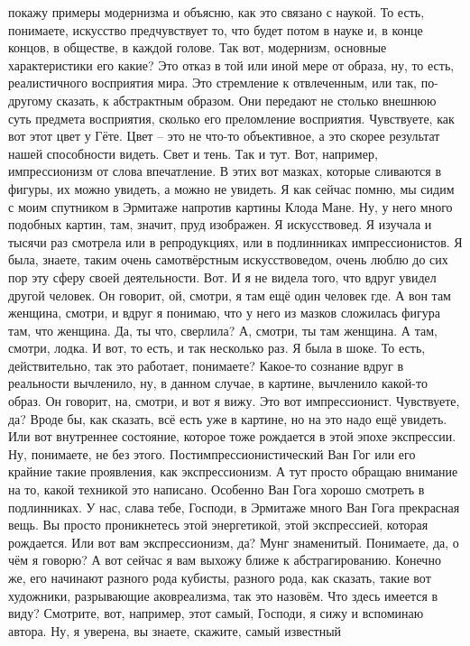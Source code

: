 покажу примеры модернизма и объясню, как это связано с наукой. То есть,
понимаете, искусство предчувствует то, что будет потом в науке и, в конце
концов, в обществе, в каждой голове. Так вот, модернизм, основные характеристики
его какие? Это отказ в той или иной мере от образа, ну, то есть, реалистичного
восприятия мира. Это стремление к отвлеченным, или так, по-другому сказать, к
абстрактным образом. Они передают не столько внешнюю суть предмета восприятия,
сколько его преломление восприятия. Чувствуете, как вот этот цвет у Гёте. Цвет –
это не что-то объективное, а это скорее результат нашей способности видеть. Свет
и тень. Так и тут. Вот, например, импрессионизм от слова впечатление. В этих вот
мазках, которые сливаются в фигуры, их можно увидеть, а можно не увидеть. Я как
сейчас помню, мы сидим с моим спутником в Эрмитаже напротив картины Клода Мане.
Ну, у него много подобных картин, там, значит, пруд изображен. Я искусствовед. Я
изучала и тысячи раз смотрела или в репродукциях, или в подлинниках
импрессионистов. Я была, знаете, таким очень самотвёрстным искусствоведом, очень
люблю до сих пор эту сферу своей деятельности. Вот. И я не видела того, что
вдруг увидел другой человек. Он говорит, ой, смотри, я там ещё один человек где.
А вон там женщина, смотри, и вдруг я понимаю, что у него из мазков сложилась
фигура там, что женщина. Да, ты что, сверлила? А, смотри, ты там женщина. А там,
смотри, лодка. И вот, то есть, и так несколько раз. Я была в шоке. То есть,
действительно, так это работает, понимаете? Какое-то сознание вдруг в реальности
вычленило, ну, в данном случае, в картине, вычленило какой-то образ. Он говорит,
на, смотри, и вот я вижу. Это вот импрессионист. Чувствуете, да? Вроде бы, как
сказать, всё есть уже в картине, но на это надо ещё увидеть. Или вот внутреннее
состояние, которое тоже рождается в этой эпохе экспрессии. Ну, понимаете, не без
этого. Постимпрессионистический Ван Гог или его крайние такие проявления, как
экспрессионизм. А тут просто обращаю внимание на то, какой техникой это
написано. Особенно Ван Гога хорошо смотреть в подлинниках. У нас, слава тебе,
Господи, в Эрмитаже много Ван Гога прекрасная вещь. Вы просто проникнетесь этой
энергетикой, этой экспрессией, которая рождается. Или вот вам экспрессионизм,
да? Мунг знаменитый. Понимаете, да, о чём я говорю? А вот сейчас я вам выхожу
ближе к абстрагированию. Конечно же, его начинают разного рода кубисты, разного
рода, как сказать, такие вот художники, разрывающие аковреализма, так это
назовём. Что здесь имеется в виду? Смотрите, вот, например, этот самый, Господи,
я сижу и вспоминаю автора. Ну, я уверена, вы знаете, скажите, самый известный
